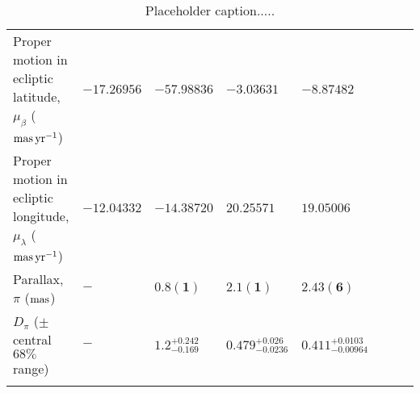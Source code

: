 \begin{table}
\begin{tabular}{llllllll}
Proper motion in ecliptic latitude, $\mu_\beta$ (${\rm mas}\,{\rm yr}^{-1}$)	 & 	 $\mathbf{ -17.26956 }$	 & 	 $\mathbf{ -57.98836 }$	 & 	 $\mathbf{ -3.03631 }$	 & 	 $\mathbf{ -8.87482 }$\\ 
Proper motion in ecliptic longitude, $\mu_\lambda$ (${\rm mas}\,{\rm yr}^{-1}$)	 & 	 $\mathbf{ -12.04332 }$	 & 	 $\mathbf{ -14.38720 }$	 & 	 $\mathbf{ 20.25571 }$	 & 	 $\mathbf{ 19.05006 }$\\ 
Parallax, $\pi$ (${\rm mas}$)	 & 	 $\mathbf{ - }$	 & 	 $\mathbf{ 0.8(1) }$	 & 	 $\mathbf{ 2.1(1) }$	 & 	 $\mathbf{ 2.43(6) }$\\ 
$D_\pi$ ($\pm$ central $68\%$ range)	 & 	 $-$	 & 	 $1.2^{ +0.242 }_{ -0.169 }$	 & 	 $0.479^{ +0.026 }_{ -0.0236 }$	 & 	 $0.411^{ +0.0103 }_{ -0.00964 }$\\ 

        \\ \hline\hline
        \end{tabular}\hfill\
        \caption{\label{tab:XXXXX}
        Placeholder caption.....
        }
        \end{table}
        